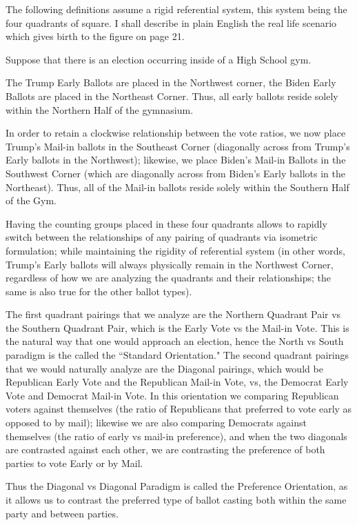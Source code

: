 \documentclass[preprint,13pt]{elsarticle}
\begin{document}
The following definitions assume a rigid referential system, this system being the four quadrants of square. I shall describe in plain English the real life scenario which gives birth to the figure on page 21.

Suppose that there is an election occurring inside of a High School gym. 

The Trump Early Ballots are placed in the Northwest corner, the Biden Early Ballots are placed in the Northeast Corner. Thus, all early ballots reside solely within the Northern Half of the gymnasium.

In order to retain a clockwise relationship between the vote ratios, we now place Trump's Mail-in ballots in the Southeast Corner (diagonally across from Trump's Early ballots in the Northwest); likewise, we place Biden's Mail-in Ballots in the Southwest Corner (which are diagonally across from Biden's Early ballots in the Northeast). Thus, all of the Mail-in ballots reside solely within the Southern Half of the Gym.

Having the counting groups placed in these four quadrants allows to rapidly switch between the relationships of any pairing of quadrants via isometric formulation; while maintaining the rigidity of referential system (in other words, Trump's Early ballots will always physically remain in the Northwest Corner, regardless of how we are analyzing the quadrants and their relationships; the same is also true for the other ballot types).

The first quadrant pairings that we analyze are the Northern Quadrant Pair vs the Southern Quadrant Pair, which is the Early Vote vs the Mail-in Vote. This is the natural way that one would approach an election, hence the North vs South paradigm is the called the ``Standard Orientation."
\newpage
The second quadrant pairings that we would naturally analyze are the Diagonal pairings, which would be Republican Early Vote and the Republican Mail-in Vote, vs, the Democrat Early Vote and Democrat Mail-in Vote. In this orientation we comparing Republican voters against themselves (the ratio of Republicans that preferred to vote early as opposed to by mail); likewise we are also comparing Democrats against themselves (the ratio of early vs mail-in preference), and when the two diagonals are contrasted against each other, we are contrasting the preference of both parties to vote Early or by Mail.

Thus the Diagonal vs Diagonal Paradigm is called the Preference Orientation, as it allows us to contrast the preferred type of ballot casting both within the same party and between parties.
\end{document}

